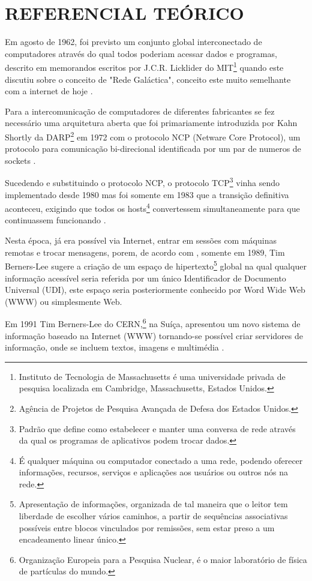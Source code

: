 \section{REFERENCIAL TEÓRICO}

Em agosto de 1962, foi previsto um conjunto global interconectado de computadores através do qual todos poderiam acessar dados e programas, descrito em memorandos escritos por J.C.R. Licklider do MIT\footnote{Instituto de Tecnologia de Massachusetts é uma universidade privada de pesquisa localizada em Cambridge, Massachusetts, Estados Unidos.} quando este discutiu sobre o conceito de "Rede Galáctica", conceito este muito semelhante com a internet de hoje \cite[p.~2]{Leiner2009}.

Para a intercomunicação de computadores de diferentes fabricantes se fez necessário uma arquitetura aberta que foi primariamente introduzida por Kahn Shortly da DARP\footnote{Agência de Projetos de Pesquisa Avançada de Defesa dos Estados Unidos.} em 1972 com o protocolo NCP (Netware Core Protocol), um protocolo para comunicação bi-direcional identificada por um par de numeros de sockets \cite[p.~4]{Leiner2009}.

Sucedendo e substituindo o protocolo NCP, o protocolo TCP\footnote{Padrão que define como estabelecer e manter uma conversa de rede através da qual os programas de aplicativos podem trocar dados.} vinha sendo implementado desde 1980 mas foi somente em 1983 que a transição definitiva aconteceu, exigindo que todos os hosts\footnote{É qualquer máquina ou computador conectado a uma rede, podendo oferecer informações, recursos, serviços e aplicações aos usuários ou outros nós na rede.} convertessem simultaneamente para que continuassem funcionando \cite[p.~7]{Leiner2009}.

Nesta época, já era possível via Internet, entrar em sessões com máquinas remotas e trocar mensagens, porem, de acordo com , somente em 1989, Tim Berners-Lee sugere a criação de um espaço de hipertexto\footnote{Apresentação de informações, organizada de tal maneira que o leitor tem liberdade de escolher vários caminhos, a partir de sequências associativas possíveis entre blocos vinculados por remissões, sem estar preso a um encadeamento linear único.} global na qual qualquer informação acessível seria referida por um único Identificador de Documento Universal (UDI), este espaço seria posteriormente conhecido por Word Wide Web (WWW) ou simplesmente Web.

Em 1991 Tim Berners-Lee do CERN,\footnote{Organização Europeia para a Pesquisa Nuclear, é o maior laboratório de física de partículas do mundo.} na Suíça, apresentou um novo sistema de informação baseado na Internet (WWW) tornando-se possível criar servidores de informação, onde se incluem textos, imagens e multimédia \cite{goethals2000historia}.

